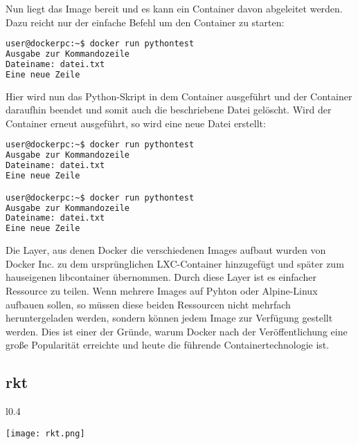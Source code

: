 Nun liegt das Image bereit und es kann ein Container davon abgeleitet werden. Dazu reicht nur der einfache Befehl  um den Container zu starten:

\begin{lstlisting}[language=bash,caption={Terminalausgabe docker run},label={code:dockerbuild}]
user@dockerpc:~$ docker run pythontest
Ausgabe zur Kommandozeile
Dateiname: datei.txt
Eine neue Zeile
\end{lstlisting}

Hier wird nun das Python-Skript in dem Container ausgeführt und der Container daraufhin beendet und somit auch die beschriebene Datei gelöscht. Wird der Container erneut ausgeführt, so wird eine neue Datei erstellt:

\begin{lstlisting}[language=bash,caption={Terminalausgabe docker run mehrfach},label={code:dockerbuild}]
user@dockerpc:~$ docker run pythontest
Ausgabe zur Kommandozeile
Dateiname: datei.txt
Eine neue Zeile

user@dockerpc:~$ docker run pythontest
Ausgabe zur Kommandozeile
Dateiname: datei.txt
Eine neue Zeile
\end{lstlisting}

Die Layer, aus denen Docker die verschiedenen Images aufbaut wurden von Docker Inc. zu dem ursprünglichen \ac{LXC}-Container hinzugefügt und später zum hauseigenen libcontainer übernommen. Durch diese Layer ist es einfacher Ressource zu teilen. Wenn mehrere Images auf Pyhton oder Alpine-Linux aufbauen sollen, so müssen diese beiden Ressourcen nicht mehrfach heruntergeladen werden, sondern können jedem Image zur Verfügung gestellt werden. Dies ist einer der Gründe, warum Docker nach der Veröffentlichung eine große Popularität erreichte und heute die führende Containertechnologie ist.\cite{dockermilestones}



\subsection*{rkt}
\label{sec:rkt}

\begin{wrapfigure}{l}{0.4\textwidth}
	\vspace{-40pt}
	\begin{center}
		\texttt{[image: rkt.png]}
	\end{center}
	\vspace{-15pt}
	\caption[Logo rkt]{ \footnotemark}
	\label{fig:rkt}
	\vspace{-30pt}
\end{wrapfigure}


